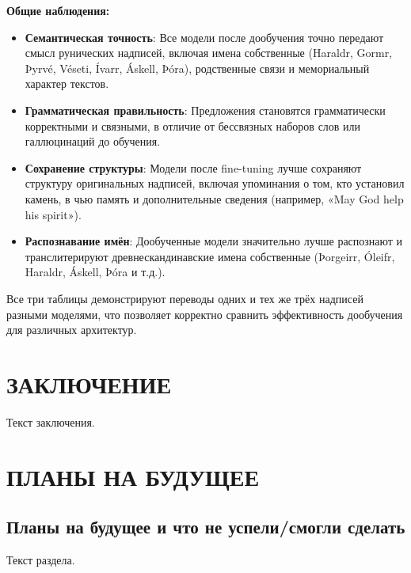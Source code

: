 \documentclass[14pt,a4paper]{extreport}
\begin{document}
\textbf{Общие наблюдения:}
\begin{itemize}
    \item \textbf{Семантическая точность}: Все модели после дообучения точно передают смысл рунических надписей, включая имена собственные (Haraldr, Gormr, Þyrvé, Véseti, Ívarr, Áskell, Þóra), родственные связи и мемориальный характер текстов.
    
    \item \textbf{Грамматическая правильность}: Предложения становятся грамматически корректными и связными, в отличие от бессвязных наборов слов или галлюцинаций до обучения.
    
    \item \textbf{Сохранение структуры}: Модели после fine-tuning лучше сохраняют структуру оригинальных надписей, включая упоминания о том, кто установил камень, в чью память и дополнительные сведения (например, «May God help his spirit»).
    
    \item \textbf{Распознавание имён}: Дообученные модели значительно лучше распознают и транслитерируют древнескандинавские имена собственные (Þorgeirr, Óleifr, Haraldr, Áskell, Þóra и т.д.).
\end{itemize}

Все три таблицы демонстрируют переводы одних и тех же трёх надписей разными моделями, что позволяет корректно сравнить эффективность дообучения для различных архитектур.

\chapter*{ЗАКЛЮЧЕНИЕ}
Текст заключения.


\chapter*{ПЛАНЫ НА БУДУЩЕЕ}
\section{Планы на будущее и что не успели/смогли сделать}
Текст раздела.
\end{document}
